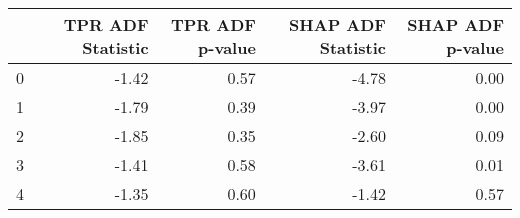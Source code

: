 \begin{tabular}{lrrrr}
\toprule
 & TPR ADF Statistic & TPR ADF p-value & SHAP ADF Statistic & SHAP ADF p-value \\
\midrule
0 & -1.42 & 0.57 & -4.78 & 0.00 \\
1 & -1.79 & 0.39 & -3.97 & 0.00 \\
2 & -1.85 & 0.35 & -2.60 & 0.09 \\
3 & -1.41 & 0.58 & -3.61 & 0.01 \\
4 & -1.35 & 0.60 & -1.42 & 0.57 \\
\bottomrule
\end{tabular}
